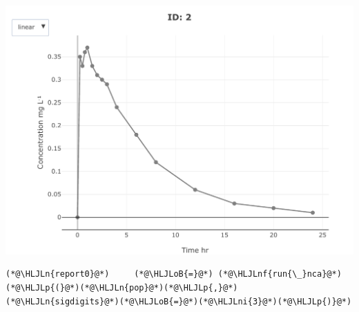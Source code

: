 \documentclass[12pt,a4paper]{article}
\newcommand{\HLJLn}[1]{#1}
\newcommand{\HLJLnf}[1]{\textcolor[RGB]{66,102,213}{#1}}
\newcommand{\HLJLni}[1]{\textcolor[RGB]{59,151,46}{#1}}
\newcommand{\HLJLoB}[1]{\textcolor[RGB]{102,102,102}{\textbf{#1}}}
\newcommand{\HLJLp}[1]{#1}
\begin{document}
\includegraphics[width=\linewidth]{jl_7EhEmm/nca_introduction_6_1.pdf}

\begin{lstlisting}
(*@\HLJLn{report0}@*)     (*@\HLJLoB{=}@*) (*@\HLJLnf{run{\_}nca}@*)(*@\HLJLp{(}@*)(*@\HLJLn{pop}@*)(*@\HLJLp{,}@*) (*@\HLJLn{sigdigits}@*)(*@\HLJLoB{=}@*)(*@\HLJLni{3}@*)(*@\HLJLp{)}@*)
\end{lstlisting}
\end{document}
